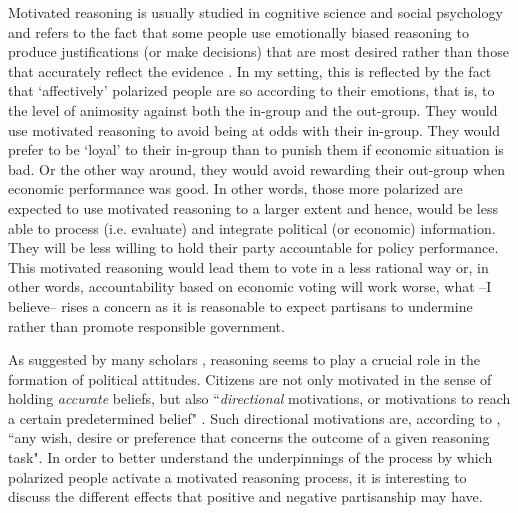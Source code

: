 \documentclass[a4paper, svgnames]{article}
\begin{document}
Motivated reasoning is usually studied in cognitive science and social psychology and refers to the fact that some people use emotionally biased reasoning to produce justifications (or make decisions) that are most desired rather than those that accurately reflect the evidence \citep{Kunda1990}. In my setting, this is reflected by the fact that `affectively' polarized people are so according to their emotions, that is, to the level of animosity against both the in-group and the out-group. They would use motivated reasoning to avoid being at odds with their in-group. They would prefer to be `loyal' to their in-group than to punish them if economic situation is bad. Or the other way around, they would avoid rewarding their out-group when economic performance was good. In other words, those more polarized are expected to use motivated reasoning to a larger extent and hence, would be less able to process (i.e. evaluate) and integrate political (or economic) information. They will be less willing to hold their party accountable for policy performance. This motivated reasoning would lead them to vote in a less rational way or, in other words, accountability based on economic voting will work worse, what --I believe-- rises a concern as it is reasonable to expect partisans to undermine rather than promote responsible government.

As suggested by many scholars \citep{Taber2006, Boyer}, reasoning seems to play a crucial role in the formation of political attitudes. Citizens are not only motivated in the sense of holding \textit{accurate} beliefs, but also ``\textit{directional} motivations, or motivations to reach a certain predetermined belief" \citep[p.2]{Boyer}. Such directional motivations are, according to \cite[p. 440]{Kunda1990}, ``any wish, desire or preference that concerns the outcome of a given reasoning task". In order to better understand the underpinnings of the process by which polarized people activate a motivated reasoning process, it is interesting to discuss the different effects that positive and negative partisanship may have.
\end{document}
